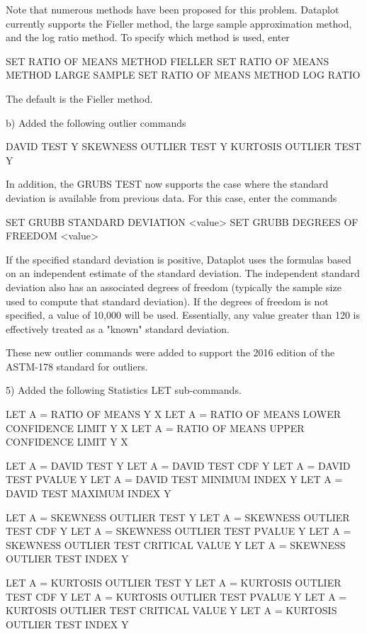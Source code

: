        Note that numerous methods have been proposed for this problem.
       Dataplot currently supports the Fieller method, the large sample
       approximation method, and the log ratio method.  To specify which
       method is used, enter

          SET RATIO OF MEANS METHOD FIELLER
          SET RATIO OF MEANS METHOD LARGE SAMPLE
          SET RATIO OF MEANS METHOD LOG RATIO

       The default is the Fieller method.  

    b) Added the following outlier commands

         DAVID TEST Y
         SKEWNESS OUTLIER TEST Y
         KURTOSIS OUTLIER TEST Y

       In addition, the GRUBS TEST now supports the case where the
       standard deviation is available from previous data.  For
       this case, enter the commands

            SET GRUBB STANDARD DEVIATION <value>
            SET GRUBB DEGREES OF FREEDOM <value>

       If the specified standard deviation is positive, Dataplot
       uses the formulas based on an independent estimate of the
       standard deviation.  The independent standard deviation also
       has an associated degrees of freedom (typically the sample
       size used to compute that standard deviation).  If the
       degrees of freedom is not specified, a value of 10,000 will
       be used.  Essentially, any value greater than 120 is
       effectively treated as a "known" standard deviation.

       These new outlier commands were added to support the
       2016 edition of the ASTM-178 standard for outliers.

 5) Added the following Statistics LET sub-commands.

      LET A = RATIO OF MEANS Y X
      LET A = RATIO OF MEANS LOWER CONFIDENCE LIMIT Y X
      LET A = RATIO OF MEANS UPPER CONFIDENCE LIMIT Y X

      LET A = DAVID TEST Y
      LET A = DAVID TEST CDF Y
      LET A = DAVID TEST PVALUE Y
      LET A = DAVID TEST MINIMUM INDEX Y
      LET A = DAVID TEST MAXIMUM INDEX Y

      LET A = SKEWNESS OUTLIER TEST Y
      LET A = SKEWNESS OUTLIER TEST CDF Y
      LET A = SKEWNESS OUTLIER TEST PVALUE Y
      LET A = SKEWNESS OUTLIER TEST CRITICAL VALUE Y
      LET A = SKEWNESS OUTLIER TEST INDEX Y

      LET A = KURTOSIS OUTLIER TEST Y
      LET A = KURTOSIS OUTLIER TEST CDF Y
      LET A = KURTOSIS OUTLIER TEST PVALUE Y
      LET A = KURTOSIS OUTLIER TEST CRITICAL VALUE Y
      LET A = KURTOSIS OUTLIER TEST INDEX Y

